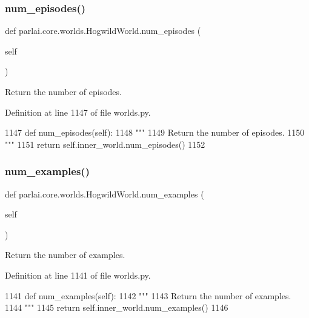 \subsubsection{\texorpdfstring{num\+\_\+episodes()}{num\_episodes()}}
{\footnotesize\ttfamily def parlai.\+core.\+worlds.\+Hogwild\+World.\+num\+\_\+episodes (\begin{DoxyParamCaption}\item[{}]{self }\end{DoxyParamCaption})}

\begin{DoxyVerb}Return the number of episodes.
\end{DoxyVerb}
 

Definition at line 1147 of file worlds.\+py.


\begin{DoxyCode}
1147     \textcolor{keyword}{def }num\_episodes(self):
1148         \textcolor{stringliteral}{"""}
1149 \textcolor{stringliteral}{        Return the number of episodes.}
1150 \textcolor{stringliteral}{        """}
1151         \textcolor{keywordflow}{return} self.inner\_world.num\_episodes()
1152 
\end{DoxyCode}
\mbox{\label{classparlai_1_1core_1_1worlds_1_1HogwildWorld_ae488971481ec6c8ba803b2404ad70e56}} 
\subsubsection{\texorpdfstring{num\+\_\+examples()}{num\_examples()}}
{\footnotesize\ttfamily def parlai.\+core.\+worlds.\+Hogwild\+World.\+num\+\_\+examples (\begin{DoxyParamCaption}\item[{}]{self }\end{DoxyParamCaption})}

\begin{DoxyVerb}Return the number of examples.
\end{DoxyVerb}
 

Definition at line 1141 of file worlds.\+py.


\begin{DoxyCode}
1141     \textcolor{keyword}{def }num\_examples(self):
1142         \textcolor{stringliteral}{"""}
1143 \textcolor{stringliteral}{        Return the number of examples.}
1144 \textcolor{stringliteral}{        """}
1145         \textcolor{keywordflow}{return} self.inner\_world.num\_examples()
1146 
\end{DoxyCode}
\mbox{\label{classparlai_1_1core_1_1worlds_1_1HogwildWorld_a9853e25a58444d4516c3f6da8c44d9c2}} 
